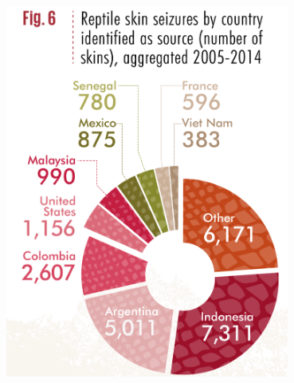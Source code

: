 \documentclass[10pt]{beamer}
\begin{document}
\begin{frame}[t]
\begin{columns}
		\begin{column}{0.5\textwidth}
			\begin{center}
				\includegraphics[width=0.7\textwidth]{figures/fashion_illegal.png}
			\end{center}
		\end{column}
	\end{columns}
\end{frame}
\end{document}

